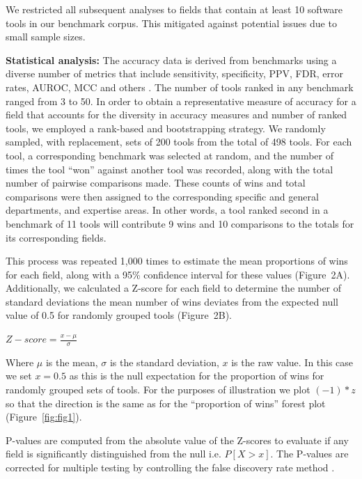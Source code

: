 \documentclass[fleqn,10pt,doc,onecolumn]{SelfArx}%
\begin{document}
We restricted all subsequent analyses to fields that contain at least 10
software tools in our benchmark corpus. This mitigated against
potential issues due to small sample sizes. 

\textbf{Statistical analysis:} The accuracy data is derived from
benchmarks using a diverse number of metrics that include sensitivity,
specificity, PPV, FDR, error rates, AUROC, MCC and others
\cite{weber2019essential}. The number of tools ranked in any benchmark
ranged from 3 to 50. In order to obtain a representative measure of
accuracy for a field that accounts for the diversity in accuracy
measures and number of ranked tools, we employed a rank-based and
bootstrapping strategy.  We randomly sampled, with replacement, sets
of 200 tools from the total of 498 tools. For each tool, a
corresponding benchmark was selected at random, and the number of
times the tool ``won'' against another tool was recorded, along with
the total number of pairwise comparisons made. These counts of wins
and total comparisons were then assigned to the corresponding
specific and general departments, and expertise areas.
In other words, a tool ranked second in a benchmark of 11 tools will
contribute 9 wins and 10 comparisons to the totals for its
corresponding fields.

This process was repeated
1,000 times to estimate the mean proportions of wins for each field,
along with a 95\% confidence interval for these values (Figure~2A).
Additionally, we calculated a Z-score for each field to determine the
number of standard deviations the mean number of wins deviates from
the expected null value of 0.5 for randomly grouped tools (Figure~2B).

$Z-score=\frac{x-\mu}{\sigma}$

Where $\mu$ is the mean, $\sigma$ is the standard deviation, $x$ is the raw
value. In this case we set $x=0.5$ as this is the null expectation for
the proportion of wins for randomly grouped sets of tools. For the
purposes of illustration we plot $(-1)*z$ so that the direction is the
same as for the ``proportion of wins'' forest plot
(Figure~\ref{fig:fig1}). 

P-values are computed from the absolute value of the Z-scores to
evaluate if any field is significantly distinguished from the null
i.e. $P[X > x]$. The P-values are corrected for multiple testing by
controlling the false discovery rate method
\cite{benjamini1995controlling}.



\end{document}
